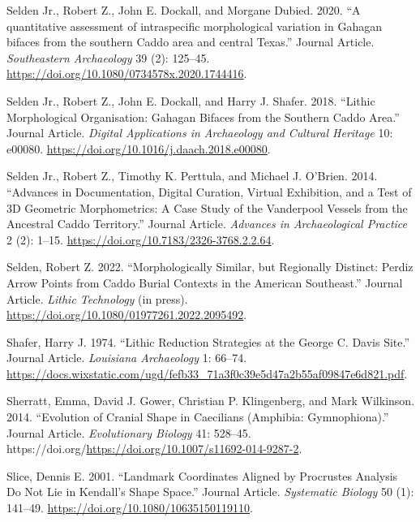\documentclass[smallextended]{svjour3}       %
\newlength{\cslhangindent}
\newlength{\cslentryspacingunit} %
\newenvironment{CSLReferences}[2] %
 {%
  \setlength{\parindent}{0pt}
  \ifodd #1
  \let\oldpar\par
  \def\par{\hangindent=\cslhangindent\oldpar}
  \fi
  \setlength{\parskip}{#2\cslentryspacingunit}
 }%
 {}
\begin{document}
\begin{CSLReferences}{1}{0}
\leavevmode{}%
Selden Jr., Robert Z., John E. Dockall, and Morgane Dubied. 2020. {``{A
quantitative assessment of intraspecific morphological variation in
Gahagan bifaces from the southern Caddo area and central Texas}.''}
Journal Article. \emph{Southeastern Archaeology} 39 (2): 125--45.
\url{https://doi.org/10.1080/0734578x.2020.1744416}.

\leavevmode{}%
Selden Jr., Robert Z., John E. Dockall, and Harry J. Shafer. 2018.
{``{Lithic Morphological Organisation: Gahagan Bifaces from the Southern
Caddo Area}.''} Journal Article. \emph{Digital Applications in
Archaeology and Cultural Heritage} 10: e00080.
\url{https://doi.org/10.1016/j.daach.2018.e00080}.

\leavevmode{}%
Selden Jr., Robert Z., Timothy K. Perttula, and Michael J. O'Brien.
2014. {``{Advances in Documentation, Digital Curation, Virtual
Exhibition, and a Test of 3D Geometric Morphometrics: A Case Study of
the Vanderpool Vessels from the Ancestral Caddo Territory}.''} Journal
Article. \emph{Advances in Archaeological Practice} 2 (2): 1--15.
\url{https://doi.org/10.7183/2326-3768.2.2.64}.

\leavevmode{}%
Selden, Robert Z. 2022. {``{Morphologically Similar, but Regionally
Distinct: Perdiz Arrow Points from Caddo Burial Contexts in the American
Southeast}.''} Journal Article. \emph{Lithic Technology} (in press).
\url{https://doi.org/10.1080/01977261.2022.2095492}.

\leavevmode{}%
Shafer, Harry J. 1974. {``{Lithic Reduction Strategies at the George C.
Davis Site}.''} Journal Article. \emph{Louisiana Archaeology} 1: 66--74.
\url{https://docs.wixstatic.com/ugd/fefb33_71a3f0c39e5d47a2b55af09847e6d821.pdf}.

\leavevmode{}%
Sherratt, Emma, David J. Gower, Christian P. Klingenberg, and Mark
Wilkinson. 2014. {``{Evolution of Cranial Shape in Caecilians (Amphibia:
Gymnophiona)}.''} Journal Article. \emph{Evolutionary Biology} 41:
528--45.
https://doi.org/\url{https://doi.org/10.1007/s11692-014-9287-2}.

\leavevmode{}%
Slice, Dennis E. 2001. {``{Landmark Coordinates Aligned by Procrustes
Analysis Do Not Lie in Kendall's Shape Space}.''} Journal Article.
\emph{Systematic Biology} 50 (1): 141--49.
\url{https://doi.org/10.1080/10635150119110}.


\end{CSLReferences}
\end{document}
